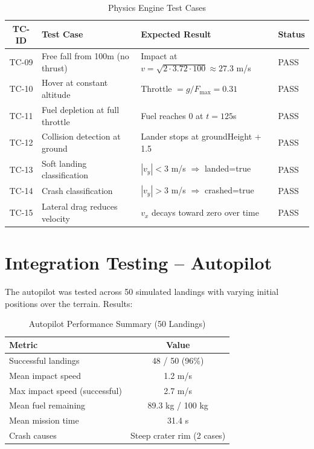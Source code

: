 \begin{table}[h]
\centering
\caption{Physics Engine Test Cases}
\label{tab:test_physics}
\begin{tabular}{|c|p{4cm}|p{4cm}|p{3cm}|}
\hline
\textbf{TC-ID} & \textbf{Test Case} & \textbf{Expected Result} & \textbf{Status} \\
\hline
TC-09 & Free fall from 100m (no thrust) & Impact at $v = \sqrt{2 \cdot 3.72 \cdot 100} \approx 27.3$ m/s & \textcolor{green!60!black}{PASS} \\
\hline
TC-10 & Hover at constant altitude & Throttle $= g/F_{\max} = 0.31$ & \textcolor{green!60!black}{PASS} \\
\hline
TC-11 & Fuel depletion at full throttle & Fuel reaches 0 at $t = 125$s & \textcolor{green!60!black}{PASS} \\
\hline
TC-12 & Collision detection at ground & Lander stops at groundHeight + 1.5 & \textcolor{green!60!black}{PASS} \\
\hline
TC-13 & Soft landing classification & $|v_y| < 3$ m/s $\Rightarrow$ landed=true & \textcolor{green!60!black}{PASS} \\
\hline
TC-14 & Crash classification & $|v_y| > 3$ m/s $\Rightarrow$ crashed=true & \textcolor{green!60!black}{PASS} \\
\hline
TC-15 & Lateral drag reduces velocity & $v_x$ decays toward zero over time & \textcolor{green!60!black}{PASS} \\
\hline
\end{tabular}
\end{table}

\section{Integration Testing -- Autopilot}

The autopilot was tested across 50 simulated landings with varying initial positions over the terrain. Results:

\begin{table}[h]
\centering
\caption{Autopilot Performance Summary (50 Landings)}
\label{tab:autopilot_results}
\begin{tabular}{|p{4cm}|c|}
\hline
\textbf{Metric} & \textbf{Value} \\
\hline
Successful landings & 48 / 50 (96\%) \\
\hline
Mean impact speed & 1.2 m/s \\
\hline
Max impact speed (successful) & 2.7 m/s \\
\hline
Mean fuel remaining & 89.3 kg / 100 kg \\
\hline
Mean mission time & 31.4 s \\
\hline
Crash causes & Steep crater rim (2 cases) \\
\hline
\end{tabular}
\end{table}

